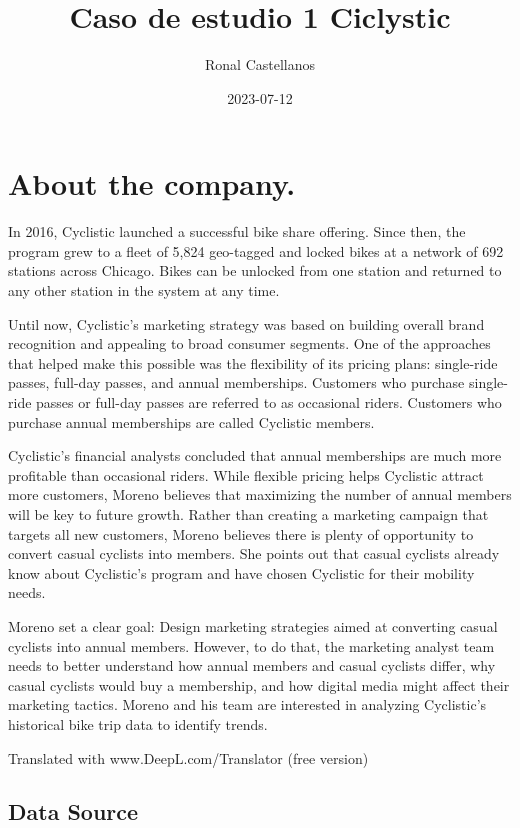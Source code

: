 \documentclass[
]{article}
\title{Caso de estudio 1 Ciclystic}
\author{Ronal Castellanos}
\date{2023-07-12}
\begin{document}
\maketitle

\hypertarget{about-the-company.}{%
\section{About the company.}\label{about-the-company.}}

In 2016, Cyclistic launched a successful bike share offering. Since
then, the program grew to a fleet of 5,824 geo-tagged and locked bikes
at a network of 692 stations across Chicago. Bikes can be unlocked from
one station and returned to any other station in the system at any time.

Until now, Cyclistic's marketing strategy was based on building overall
brand recognition and appealing to broad consumer segments. One of the
approaches that helped make this possible was the flexibility of its
pricing plans: single-ride passes, full-day passes, and annual
memberships. Customers who purchase single-ride passes or full-day
passes are referred to as occasional riders. Customers who purchase
annual memberships are called Cyclistic members.

Cyclistic's financial analysts concluded that annual memberships are
much more profitable than occasional riders. While flexible pricing
helps Cyclistic attract more customers, Moreno believes that maximizing
the number of annual members will be key to future growth. Rather than
creating a marketing campaign that targets all new customers, Moreno
believes there is plenty of opportunity to convert casual cyclists into
members. She points out that casual cyclists already know about
Cyclistic's program and have chosen Cyclistic for their mobility needs.

Moreno set a clear goal: Design marketing strategies aimed at converting
casual cyclists into annual members. However, to do that, the marketing
analyst team needs to better understand how annual members and casual
cyclists differ, why casual cyclists would buy a membership, and how
digital media might affect their marketing tactics. Moreno and his team
are interested in analyzing Cyclistic's historical bike trip data to
identify trends.

Translated with www.DeepL.com/Translator (free version)

\hypertarget{data-source}{%
\subsection{Data Source}\label{data-source}}
\end{document}
